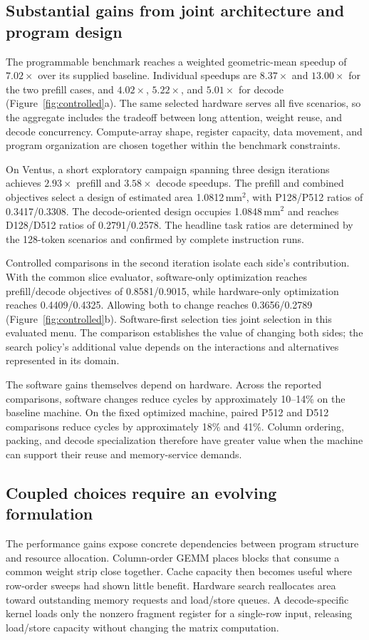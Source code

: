 \subsection{Substantial gains from joint architecture and program design}\label{sec:joint-results}
The programmable benchmark reaches a weighted geometric-mean speedup of $7.02\times$ over its supplied baseline. Individual speedups are $8.37\times$ and $13.00\times$ for the two prefill cases, and $4.02\times$, $5.22\times$, and $5.01\times$ for decode (Figure~\ref{fig:controlled}a). The same selected hardware serves all five scenarios, so the aggregate includes the tradeoff between long attention, weight reuse, and decode concurrency. Compute-array shape, register capacity, data movement, and program organization are chosen together within the benchmark constraints.

On Ventus, a short exploratory campaign spanning three design iterations achieves $2.93\times$ prefill and $3.58\times$ decode speedups. The prefill and combined objectives select a design of estimated area 1.0812\,mm$^2$, with P128/P512 ratios of 0.3417/0.3308. The decode-oriented design occupies 1.0848\,mm$^2$ and reaches D128/D512 ratios of 0.2791/0.2578. The headline task ratios are determined by the 128-token scenarios and confirmed by complete instruction runs.

Controlled comparisons in the second iteration isolate each side's contribution. With the common slice evaluator, software-only optimization reaches prefill/decode objectives of 0.8581/0.9015, while hardware-only optimization reaches 0.4409/0.4325. Allowing both to change reaches 0.3656/0.2789 (Figure~\ref{fig:controlled}b). Software-first selection ties joint selection in this evaluated menu. The comparison establishes the value of changing both sides; the search policy's additional value depends on the interactions and alternatives represented in its domain.

The software gains themselves depend on hardware. Across the reported comparisons, software changes reduce cycles by approximately 10--14\% on the baseline machine. On the fixed optimized machine, paired P512 and D512 comparisons reduce cycles by approximately 18\% and 41\%. Column ordering, packing, and decode specialization therefore have greater value when the machine can support their reuse and memory-service demands.



\subsection{Coupled choices require an evolving formulation}\label{sec:tiling-results}
The performance gains expose concrete dependencies between program structure and resource allocation. Column-order GEMM places blocks that consume a common weight strip close together. Cache capacity then becomes useful where row-order sweeps had shown little benefit. Hardware search reallocates area toward outstanding memory requests and load/store queues. A decode-specific kernel loads only the nonzero fragment register for a single-row input, releasing load/store capacity without changing the matrix computation.

